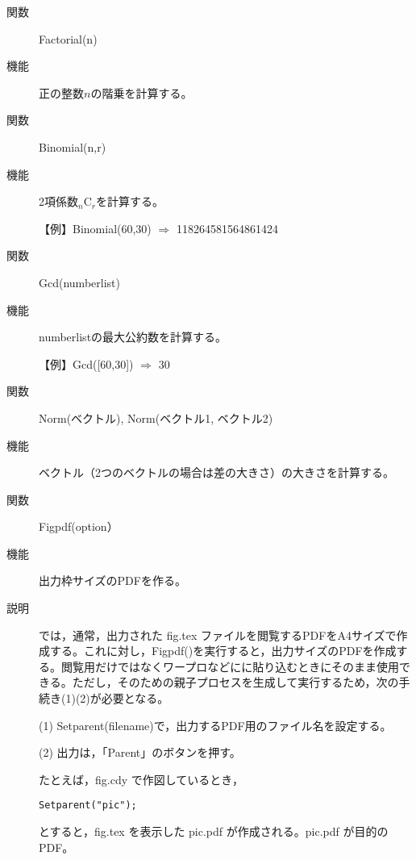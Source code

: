 \documentclass[papersize,a4paper,10pt,uplatex]{jsarticle}
\begin{document}
\begin{description}
\vspace{\baselineskip}

\hypertarget{factorial}{}
\item[関数]Factorial(n)
\item[機能]正の整数$n$の階乗を計算する。

\vspace{\baselineskip}

\hypertarget{binomial}{}
\item[関数]Binomial(n,r)
\item[機能]2項係数${}_n\mathrm{C}_r$を計算する。

\vspace{\baselineskip}
【例】Binomial(60,30) $\Rightarrow$ 118264581564861424

\vspace{\baselineskip}

\hypertarget{gcd}{}
\item[関数]Gcd(numberlist)
\item[機能]numberlistの最大公約数を計算する。

\vspace{\baselineskip}
【例】Gcd([60,30]) $\Rightarrow$ 30

\vspace{\baselineskip}

\hypertarget{norm}{}
\item[関数]Norm(ベクトル), Norm(ベクトル1, ベクトル2)
\item[機能]ベクトル（2つのベクトルの場合は差の大きさ）の大きさを計算する。

\vspace{\baselineskip}

\hypertarget{figpdf}{}
\item[関数]Figpdf(option）
\item[機能]出力枠サイズのPDFを作る。
\item[説明]\ketcindy では，通常，出力された fig.tex ファイルを閲覧するPDFをA4サイズで作成する。これに対し，Figpdf()を実行すると，出力サイズのPDFを作成する。閲覧用だけではなくワープロなどにに貼り込むときにそのまま使用できる。ただし，そのための親子プロセスを生成して実行するため，次の手続き(1)(2)が必要となる。

\vspace{\baselineskip}
(1) Setparent(filename)で，出力するPDF用のファイル名を設定する。

(2) 出力は，「Parent」のボタンを押す。

\vspace{\baselineskip}
たとえば，fig.cdy で作図しているとき，
\begin{verbatim}
Setparent("pic");
\end{verbatim}
とすると，fig.tex を表示した pic.pdf が作成される。pic.pdf が目的のPDF。


\end{description}
\end{document}

